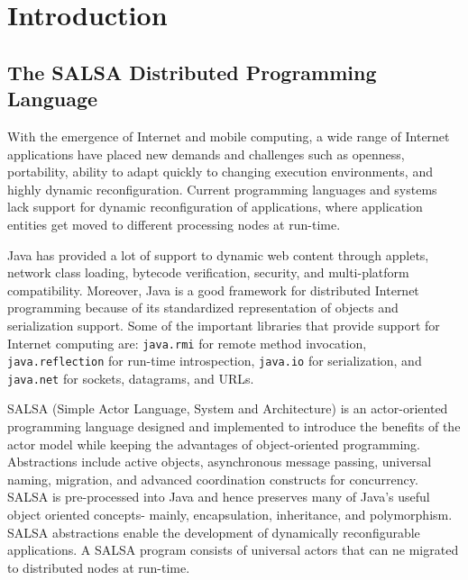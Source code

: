  
\chapter{Introduction}\label{Introduction}

\section{The SALSA Distributed Programming Language}
\label{The SALSA Distributed Programming Language}
With the emergence of Internet and mobile computing, a wide range 
of Internet applications have placed new demands and challenges 
such as openness, portability, ability to adapt quickly to changing 
execution environments, and highly dynamic reconfiguration. Current 
programming languages and systems lack support for dynamic 
reconfiguration of applications, where application entities get
moved to different processing nodes at run-time.

Java has provided a lot of support to dynamic web content through 
applets, network class loading, bytecode verification, security, 
and multi-platform compatibility. Moreover, Java is a good framework 
for distributed Internet programming because of its standardized 
representation of objects and serialization support. 
Some of the important libraries that provide support for Internet 
computing are: {\tt java.rmi} for remote method invocation, 
{\tt java.reflection} for run-time introspection, {\tt java.io} for 
serialization, and {\tt java.net} for sockets, datagrams, and URLs.

SALSA (Simple Actor Language, System and Architecture) 
\cite{varela-agha-salsa-oopsla-2001} is an 
actor-oriented programming language designed and implemented to 
introduce the benefits of the actor model while keeping the advantages 
of object-oriented programming. Abstractions include active objects, 
asynchronous message passing, universal naming, migration, and advanced 
coordination constructs for concurrency. SALSA is pre-processed into 
Java and hence preserves many of Java's useful object oriented concepts- 
mainly, encapsulation, inheritance, and polymorphism. SALSA abstractions 
enable the development of dynamically reconfigurable applications. A SALSA
program consists of universal actors that can ne migrated to distributed 
nodes at run-time.

